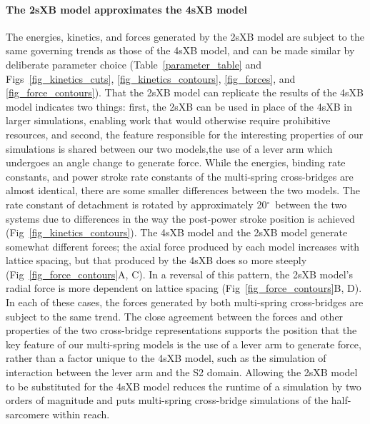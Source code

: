 \documentclass[10pt]{article}
\newcommand{\de}{$^\circ$} %
\begin{document}
\paragraph*{The 2sXB model approximates the 4sXB model} %
The energies, kinetics, and forces generated by the 2sXB model are subject to the same governing trends as those of the 4sXB model, and can be made similar by deliberate parameter choice (Table~\ref{parameter_table} and Figs~\ref{fig_kinetics_cuts}, \ref{fig_kinetics_contours}, \ref{fig_forces}, and \ref{fig_force_contours}). 
That the 2sXB model can replicate the results of the 4sXB model indicates two things: first, the 2sXB can be used in place of the 4sXB in larger simulations, enabling work that would otherwise require prohibitive resources, and second, the feature responsible for the interesting properties of our simulations is shared between our two models,the use of a lever arm which undergoes an angle change to generate force. 
While the energies, binding rate constants, and power stroke rate constants of the multi-spring cross-bridges are almost identical, there are some smaller differences between the two models. 
The rate constant of detachment is rotated by approximately 20\de~between the two systems due to differences in the way the post-power stroke position is achieved (Fig~\ref{fig_kinetics_contours}).
The 4sXB model and the 2sXB model generate somewhat different forces; the axial force produced by each model increases with lattice spacing, but that produced by the 4sXB does so more steeply (Fig~\ref{fig_force_contours}A, C). 
In a reversal of this pattern, the 2sXB model's radial force is more dependent on lattice spacing (Fig~\ref{fig_force_contours}B, D).  
In each of these cases, the forces generated by both multi-spring cross-bridges are subject to the same trend.
The close agreement between the forces and other properties of the two cross-bridge representations supports the position that the key feature of our multi-spring models is the use of a lever arm to generate force, rather than a factor unique to the 4sXB model, such as the simulation of interaction between the lever arm and the S2 domain. 
Allowing the 2sXB model to be substituted for the 4sXB model reduces the runtime of a simulation by two orders of magnitude and puts multi-spring cross-bridge simulations of the half-sarcomere within reach.
\end{document}
